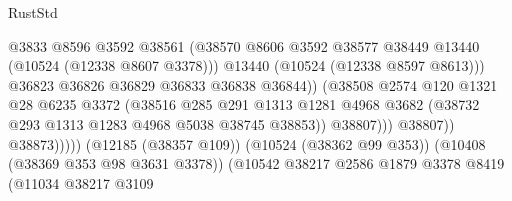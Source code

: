\begin{lexlean}{RustStd}
\begin{coremodule}
                                                  @3833
                                                  @8596
                                                  @3592
                                                  @38561
                                                  (@38570
                                                    @8606
                                                    @3592
                                                    @38577
                                                    @38449
                                                    @13440
                                                    (@10524 (@12338 @8607 @3378)))
                                                  @13440
                                                  (@10524 (@12338 @8597 @8613)))
                                                @36823
                                                @36826
                                                @36829
                                                @36833
                                                @36838
                                                @36844))
                                            (@38508
                                              @2574
                                              @120
                                              @1321
                                              @28
                                              @6235
                                              @3372
                                              (@38516
                                                @285
                                                @291
                                                @1313
                                                @1281
                                                @4968
                                                @3682
                                                (@38732 @293 @1313 @1283 @4968 @5038 @38745 @38853))
                                              @38807)))
                                        @38807))
                                    @38873)))))
                          (@12185 (@38357 @109))
                          (@10524 (@38362 @99 @353))
                          (@10408 (@38369 @353 @98 @3631 @3378))
                          (@10542
                            @38217
                            @2586
                            @1879
                            @3378
                            @8419
                            (@11034
                              @38217
                              @3109

\end{coremodule}
\end{lexlean}
